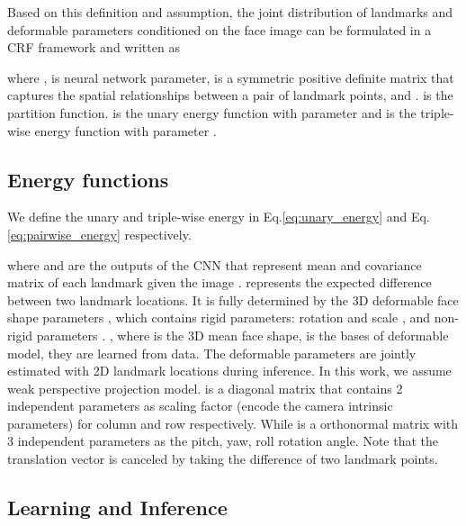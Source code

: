 \documentclass{article}
\begin{document}
Based on this definition and assumption, the joint distribution of landmarks  and deformable parameters  conditioned on the face image  can be formulated in a CRF framework and written as

where ,  is neural network parameter,  is a  symmetric positive definite matrix that captures the spatial relationships between a pair of landmark points,  and .  is the partition function.  is the unary energy function with parameter  and  is the triple-wise energy function with parameter .

\subsection{Energy functions} \label{sub:energy_functions}
We define the unary and triple-wise energy in Eq.\eqref{eq:unary_energy} and Eq.\eqref{eq:pairwise_energy} respectively.


where  and  are the outputs of the CNN that represent mean and covariance matrix of each landmark given the image .  represents the expected difference between two landmark locations. It is fully determined by the 3D deformable face shape parameters , which contains rigid parameters: rotation  and scale , and non-rigid parameters .
,
where  is the 3D mean face shape,  is the bases of deformable model, they are learned from data. The deformable parameters  are jointly estimated with 2D landmark locations during inference.
In this work, we assume weak perspective projection model.  is a  diagonal matrix that contains 2 independent parameters  as scaling factor (encode the camera intrinsic parameters) for column and row respectively. While  is a  orthonormal matrix with 3 independent parameters  as the pitch, yaw, roll rotation angle. Note that the translation vector is canceled by taking the difference of two landmark points. 








\subsection{Learning and Inference} \label{sub:learning_inference}
\end{document}
